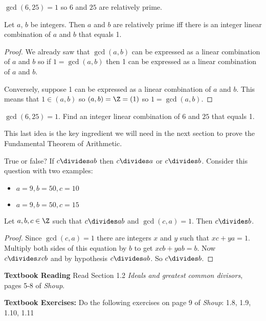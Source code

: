 \documentclass[oneside,12pt]{amsart}
\begin{document}
\begin{in_class_example}
$\gcd(6,25) = 1$ so $6$ and $25$ are relatively prime.
\end{in_class_example}

\begin{theorem}
Let $a$, $b$ be integers. Then $a$ and $b$ are relatively prime iff
there is an integer linear combination of $a$ and $b$ that equals 1.
\end{theorem}
\begin{proof}
We already saw that $\gcd(a,b)$ can be expressed as a linear combination
of $a$ and $b$ so if $1=\gcd(a,b)$ then 1 can be expressed as a linear combination
of $a$ and $b$.

Conversely, suppose 1 can be expressed as a linear combination of $a$ and $b$.
This means that $1\in (a,b)$ so $(a,b) = \Z = (1)$ so $1=\gcd(a,b)$.
\end{proof}

\begin{in_class_example}
$\gcd(6,25) = 1$. Find an integer linear combination of $6$ and $25$
that equals 1.
\end{in_class_example}

This last idea is the key ingredient we will need in the next section to
prove the Fundamental Theorem of Arithmetic.

\begin{in_class_example}
True or false? If $c \divides ab$ then $c\divides a$ or $c \divides b$.
Consider this question with two examples:
\begin{itemize}
\item $a = 9,  b = 50, c = 10$
\item $a = 9,  b = 50, c = 15$
\end{itemize}
\end{in_class_example}

\begin{theorem}
Let $a,b,c \in \Z$ such that $c\divides ab$ and $\gcd(c,a) = 1$.
Then $c \divides b$.
\end{theorem}
\begin{proof}
Since $\gcd(c,a) = 1$ there are integers $x$ and $y$ such that
$xc + ya = 1$. Multiply both sides of this equation by $b$ to
get $xcb + yab = b$.  Now $c\divides xcb$ and by hypothesis
$c\divides ab$. So $c\divides b$.
\end{proof}

\bigskip

\textbf{Textbook Reading} Read Section 1.2
\emph{Ideals and greatest common divisors}, pages 5-8 of \emph{Shoup}.

\bigskip

\textbf{Textbook Exercises:} Do the following exercises on page 9 of
\emph{Shoup}: 1.8, 1.9, 1.10, 1.11




\end{document}
